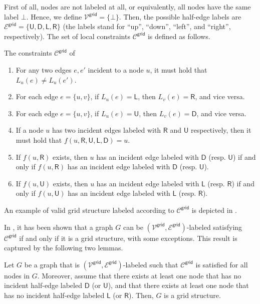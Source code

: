 \documentclass[11pt]{article}
\newcommand{\lleft}{\mathsf {L}}
\newcommand{\lright}{\mathsf {R}}
\newcommand{\lup}{\mathsf {U}}
\newcommand{\ldown}{\mathsf {D}}
\newcommand{\lgrid}{\mathsf {grid}}
\begin{document}
First of all, nodes are not labeled at all, or equivalently, all nodes have the same label $\bot$. Hence, we define $\mathcal{V^\lgrid} = \{\bot\}$. Then, the possible half-edge labels are $\mathcal{E^\lgrid} = \{\lup,\ldown, \lleft, \lright\}$ (the labels stand for ``up'', ``down'', ``left'', and ``right'', respectively). 
The set of local constraints $\mathcal{C}^{\lgrid}$ is defined as follows.


\begin{myframe}{The constraints $\mathcal{C}^{\lgrid}$ of \cite{congest-lcls}}
\begin{enumerate}
	\item For any two edges $e,e'$ incident to a node $u$, it must hold that $L_u(e)\neq L_u(e')$.\label{cons-grid:differentEdgeLabels}
	
	\item For each edge $e=\{u,v\}$, if $L_u(e)=\lleft$, then $L_v(e)=\lright$, and vice versa. \label{cons-grid:left-right}
	
	\item For each edge $e=\{u,v\}$, if $L_u(e)=\lup$, then $L_v(e)=\ldown$, and vice versa.\label{cons-grid:up-down}
	
	\item If a node $u$ has two incident edges labeled with $\lright$ and $\lup$ respectively, then it must hold that $f(u, \lright,\lup,\lleft,\ldown)=u$. \label{cons-grid:square}
	
	\item If $f(u,\lright)$ exists, then
	$u$ has an incident edge labeled with $\ldown$ (resp. $\lup$) if and only if  $f(u,\lright)$ has an incident edge labeled with $\ldown$ (resp. $\lup$). \label{cons-grid:down-propagates}
	
	\item If $f(u,\lup)$ exists, then
	$u$ has an incident edge labeled with $\lleft$ (resp. $\lright$) if and only if  $f(u,\lup)$ has an incident edge labeled with $\lleft$  (resp. $\lright$). \label{cons-grid:left-propagates}
\end{enumerate}
\end{myframe}
\noindent An example of valid grid structure labeled according to $\mathcal{C}^{\lgrid}$ is depicted in .

In \cite{congest-lcls}, it has been shown that a graph $G$ can be $(\mathcal{V^\lgrid},\mathcal{E^\lgrid})$-labeled satisfying $\mathcal{C}^{\lgrid}$ if and only if it is a grid structure, with some exceptions. This result is captured by the following two lemmas.
\begin{lemma}\label{lem:grid}
	Let $G$ be a graph that is $(\mathcal{V^\lgrid},\mathcal{E^\lgrid})$-labeled such that $\mathcal{C}^{\lgrid}$ is satisfied for all nodes in $G$. Moreover, assume that there exists at least one node that has no incident half-edge labeled $\ldown$ (or $\lup$), and that there exists at least one node that has no incident half-edge labeled $\lleft$ (or $\lright$). Then, $G$ is a grid structure.
\end{lemma}
\end{document}
